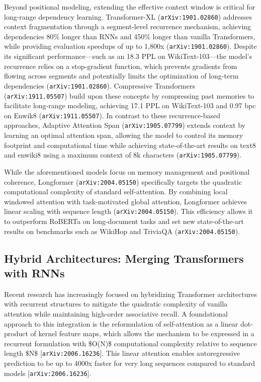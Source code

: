 \documentclass[11pt]{article}
\begin{document}
Beyond positional modeling, extending the effective context window is critical for long-range dependency learning. Transformer-XL (\texttt{arXiv:1901.02860}) addresses context fragmentation through a segment-level recurrence mechanism, achieving dependencies 80\% longer than RNNs and 450\% longer than vanilla Transformers, while providing evaluation speedups of up to 1,800x (\texttt{arXiv:1901.02860}). Despite its significant performance—such as an 18.3 PPL on WikiText-103—the model's recurrence relies on a stop-gradient function, which prevents gradients from flowing across segments and potentially limits the optimization of long-term dependencies (\texttt{arXiv:1901.02860}). Compressive Transformers (\texttt{arXiv:1911.05507}) build upon these concepts by compressing past memories to facilitate long-range modeling, achieving 17.1 PPL on WikiText-103 and 0.97 bpc on Enwik8 (\texttt{arXiv:1911.05507}). In contrast to these recurrence-based approaches, Adaptive Attention Span (\texttt{arXiv:1905.07799}) extends context by learning an optimal attention span, allowing the model to control its memory footprint and computational time while achieving state-of-the-art results on text8 and enwiki8 using a maximum context of 8k characters (\texttt{arXiv:1905.07799}).

While the aforementioned models focus on memory management and positional coherence, Longformer (\texttt{arXiv:2004.05150}) specifically targets the quadratic computational complexity of standard self-attention. By combining local windowed attention with task-motivated global attention, Longformer achieves linear scaling with sequence length (\texttt{arXiv:2004.05150}). This efficiency allows it to outperform RoBERTa on long-document tasks and set new state-of-the-art results on benchmarks such as WikiHop and TriviaQA (\texttt{arXiv:2004.05150}).

\subsection{Hybrid Architectures: Merging Transformers with RNNs}

Recent research has increasingly focused on hybridizing Transformer architectures with recurrent structures to mitigate the quadratic complexity of vanilla attention while maintaining high-order associative recall. A foundational approach to this integration is the reformulation of self-attention as a linear dot-product of kernel feature maps, which allows the mechanism to be expressed in a recurrent formulation with \$O(N)\$ computational complexity relative to sequence length \$N\$ [\texttt{arXiv:2006.16236}]. This linear attention enables autoregressive prediction to be up to 4000x faster for very long sequences compared to standard models [\texttt{arXiv:2006.16236}].
\end{document}
